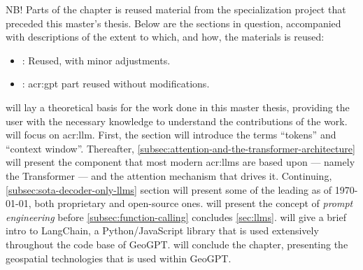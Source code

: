 \begin{itshape}
    NB! Parts of the  chapter is reused material from the specialization project \citep{holmLLMsDeathGIS2023} that preceded this master's thesis. Below are the sections in question, accompanied with descriptions of the extent to which, and how, the materials is reused:

    \begin{itemize}
        \item {}: Reused, with minor adjustments.
        \item {}: \acrshort{acr:gpt} part reused without modifications.
    \end{itemize}
\end{itshape}

\vspace{12pt}

\noindent {} will lay a theoretical basis for the work done in this master thesis, providing the user with the necessary knowledge to understand the contributions of the work.  will focus on \gls{acr:llm}. First, the section will introduce the terms \enquote{tokens} and \enquote{context window}. Thereafter, \autoref{subsec:attention-and-the-transformer-architecture} will present the component that most modern \glspl{acr:llm} are based upon --- namely the Transformer --- and the attention mechanism that drives it. Continuing, \autoref{subsec:sota-decoder-only-llms} section will present some of the leading  as of \today, both proprietary and open-source ones.  will present the concept of \textit{prompt engineering} before \autoref{subsec:function-calling} concludes \autoref{sec:llms}.  will give a brief intro to LangChain, a Python/JavaScript library that is used extensively throughout the code base of GeoGPT.  will conclude the  chapter, presenting the geospatial technologies that is used within GeoGPT.


\section[Large Language Models]{}
\label{sec:llms}

